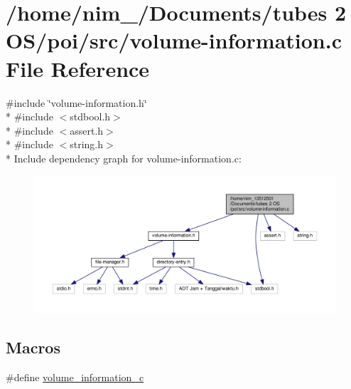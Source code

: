 \hypertarget{volume-information_8c}{\section{/home/nim\-\_/\-Documents/tubes 2 O\-S/poi/src/volume-\/information.c File Reference}
\label{volume-information_8c}
}
{\ttfamily \#include \char`\"{}volume-\/information.\-h\char`\"{}}\\*
{\ttfamily \#include $<$stdbool.\-h$>$}\\*
{\ttfamily \#include $<$assert.\-h$>$}\\*
{\ttfamily \#include $<$string.\-h$>$}\\*
Include dependency graph for volume-\/information.c\-:
\nopagebreak
\begin{figure}[H]
\begin{center}
\leavevmode
\includegraphics[width=350pt]{volume-information_8c__incl}
\end{center}
\end{figure}
\subsection*{Macros}
\begin{DoxyCompactItemize}
\item 
\#define \hyperlink{volume-information_8c_aa2ebcd0c3a3beac7a43ef1b7be6be0b3}{volume\-\_\-information\-\_\-c}
\end{DoxyCompactItemize}
